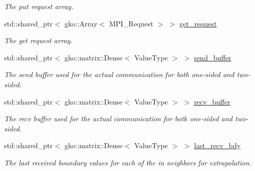 \begin{DoxyCompactItemize}
\begin{DoxyCompactList}\small\item\em The put request array. \end{DoxyCompactList}\item 
\mbox{\label{structschwz_1_1Communicate_1_1comm__struct_a50ab7728b835b599c376a7fe11dbe513}} 
std\+::shared\+\_\+ptr$<$ gko\+::\+Array$<$ M\+P\+I\+\_\+\+Request $>$ $>$ \hyperlink{structschwz_1_1Communicate_1_1comm__struct_a50ab7728b835b599c376a7fe11dbe513}{get\+\_\+request}
\begin{DoxyCompactList}\small\item\em The get request array. \end{DoxyCompactList}\item 
\mbox{\label{structschwz_1_1Communicate_1_1comm__struct_aacb91f128f3bb0bf4cd5d43716bbbcee}} 
std\+::shared\+\_\+ptr$<$ gko\+::matrix\+::\+Dense$<$ Value\+Type $>$ $>$ \hyperlink{structschwz_1_1Communicate_1_1comm__struct_aacb91f128f3bb0bf4cd5d43716bbbcee}{send\+\_\+buffer}
\begin{DoxyCompactList}\small\item\em The send buffer used for the actual communication for both one-\/sided and two-\/sided. \end{DoxyCompactList}\item 
\mbox{\label{structschwz_1_1Communicate_1_1comm__struct_a78779301f90436a717cc8dcf50a5d717}} 
std\+::shared\+\_\+ptr$<$ gko\+::matrix\+::\+Dense$<$ Value\+Type $>$ $>$ \hyperlink{structschwz_1_1Communicate_1_1comm__struct_a78779301f90436a717cc8dcf50a5d717}{recv\+\_\+buffer}
\begin{DoxyCompactList}\small\item\em The recv buffer used for the actual communication for both one-\/sided and two-\/sided. \end{DoxyCompactList}\item 
\mbox{\label{structschwz_1_1Communicate_1_1comm__struct_a05e85528bc51751b41dcb4f1ded33bd8}} 
std\+::shared\+\_\+ptr$<$ gko\+::matrix\+::\+Dense$<$ Value\+Type $>$ $>$ \hyperlink{structschwz_1_1Communicate_1_1comm__struct_a05e85528bc51751b41dcb4f1ded33bd8}{last\+\_\+recv\+\_\+bdy}
\begin{DoxyCompactList}\small\item\em The last received boundary values for each of the in neighbors for extrapolation. \end{DoxyCompactList}\item 

\end{DoxyCompactItemize}
